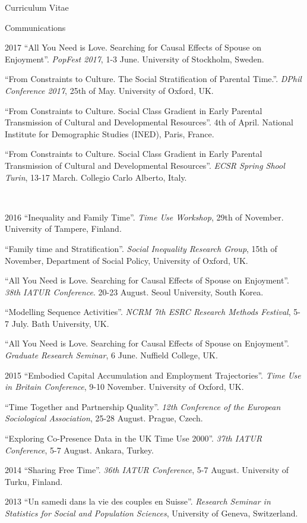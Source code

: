 \documentclass[12pt,a4paper]{article}
\begin{document}
\begin{cv}{Curriculum Vitae}
\begin{cvlist}{Communications}
	\item[2017] ``All You Need is Love. Searching for Causal Effects of Spouse on Enjoyment''. \emph{PopFest 2017}, 1-3 June. University of Stockholm, Sweden. 
	
	\item[] ``From Constraints to Culture.
The Social Stratification of Parental Time.''. \emph{DPhil Conference 2017}, 25th of May. University of Oxford, UK. 
	
	\item[]  ``From Constraints to Culture. Social Class Gradient in Early Parental Transmission of Cultural and Developmental Resources''. 4th of April. National Institute for Demographic Studies (INED), Paris, France. 
	
	\item[]  ``From Constraints to Culture. Social Class Gradient in Early Parental Transmission of Cultural and Developmental Resources''. \emph{ECSR Spring Shool Turin}, 13-17 March. Collegio Carlo Alberto, Italy. 
	
	 \item[2016]  ``Inequality and Family Time''. \emph{Time Use Workshop}, 29th of November. University of Tampere, Finland. 
	 
	 \item[]  ``Family time and Stratification''. \emph{Social Inequality Research Group}, 15th of November, Department of Social Policy, University of Oxford, UK.  
	 
	 \item[]  ``All You Need is Love. Searching for Causal Effects of Spouse on Enjoyment''. \emph{38th IATUR Conference}. 20-23 August. Seoul University, South Korea. 
	 
	 \item[]  ``Modelling Sequence Activities''. \emph{NCRM 7th ESRC Research Methods Festival}, 5-7 July. Bath University, UK. 
	 
	  \item[]  ``All You Need is Love. Searching for Causal Effects of Spouse on Enjoyment''. \emph{Graduate Research Seminar}, 6 June. Nuffield College, UK. 
	  
	   \item[2015]  ``Embodied Capital Accumulation and Employment Trajectories''. \emph{Time Use in Britain Conference}, 9-10 November. University of Oxford, UK.  
	   
	   	 \item[]  ``Time Together and Partnership Quality''. \emph{12th Conference of the European Sociological Association}, 25-28 August. Prague, Czech.  
	   
	      \item[]  ``Exploring Co-Presence Data in the UK Time Use 2000''. \emph{37th IATUR Conference}, 5-7 August. Ankara, Turkey.  
	      
	       \item[2014]  ``Sharing Free Time''. \emph{36th IATUR Conference}, 5-7 August. University of Turku, Finland.  
	        
	        \item[2013] ``Un samedi dans la vie des couples en Suisse''. \emph{Research Seminar in Statistics for Social and Population Sciences}, University of Geneva, Switzerland. 
	        \end{cvlist}


\end{cv}
\end{document}
